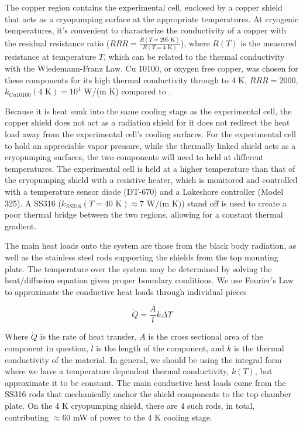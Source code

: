 The copper region contains the experimental cell, enclosed by a copper shield that acts as a cryopumping surface at the appropriate temperatures. At cryogenic temperatures, it's convenient to characterize the conductivity of a copper with the residual resistance ratio ($RRR=\frac{R(T=295\text{ K})}{R(T=4\text{ K})}$), where $R(T)$ is the measured resistance at temperature $T$, which can be related to the thermal conductivity with the Wiedemann-Franz Law.\cite{White2009} Cu 10100, or oxygen free copper, was chosen for these components for its high thermal conductivity through to 4 K, $RRR=2000$, $k_{Cu10100}(4\text{ K}) = 10^4$ W/(m K) compared to \cite{NIST}.

Because it is heat sunk into the same cooling stage as the experimental cell, the copper shield does not act as a radiation shield for it does not redirect the heat load away from the experimental cell's cooling surfaces. For the experimental cell to hold an appreciable vapor pressure, while the thermally linked shield acts as a cryopumping surfaces, the two components will need to held at different temperatures. The experimental cell is held at a higher temperature than that of the cryopumping shield with a resistive heater, which is monitored and controlled with a temperature sensor diode (DT-670) and a Lakeshore controller (Model 325). A SS316 ($k_{SS316}(T=40\text{ K}) \approx 7\text{ W/(m K)}$) stand off is used to create a poor thermal bridge between the two regions, allowing for a constant thermal gradient.

The main heat loads onto the system are those from the black body radiation, as well as the stainless steel rods supporting the shields from the top mounting plate. The temperature over the system may be determined by solving the heat/diffusion equation given proper boundary conditions. We use Fourier's Law to approximate the conductive heat loads through individual pieces


\begin{equation}
	\dot{Q} = \frac{A}{l}k\Delta T
	\label{eq: fourier law}
\end{equation}

Where $\dot{Q}$ is the rate of heat transfer, $A$ is the cross sectional area of the component in question, $l$ is the length of the component, and $k$ is the thermal conductivity of the material. In general, we should be using the integral form where we have a temperature dependent thermal conductivity, $k(T)$, but approximate it to be constant. The main conductive heat loads come from the SS316 rods that mechanically anchor the shield components to the top chamber plate. On the 4 K cryopumping shield, there are 4 such rods, in total, contributing $\approx 60$ mW of power to the 4 K cooling stage.

